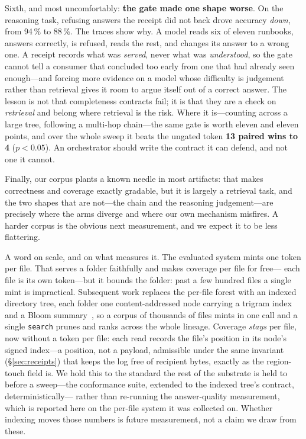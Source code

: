 \documentclass[10pt,twocolumn]{article}
\newcommand{\tok}[1]{\texttt{#1}}
\begin{document}
Sixth, and most uncomfortably: \textbf{the gate made one shape worse}. On the
reasoning task, refusing answers the receipt did not back drove accuracy
\emph{down}, from 94\,\% to 88\,\%. The traces show why. A model reads six of
eleven runbooks, answers correctly, is refused, reads the rest, and changes its
answer to a wrong one. A receipt records what was \emph{served}, never what was
\emph{understood}, so the gate cannot tell a consumer that concluded too early
from one that had already seen enough---and forcing more evidence on a model
whose difficulty is judgement rather than retrieval gives it room to argue
itself out of a correct answer. The lesson is not that completeness contracts
fail; it is that they are a check on \emph{retrieval} and belong where retrieval
is the risk. Where it is---counting across a large tree, following a multi-hop
chain---the same gate is worth eleven and eleven points, and over the whole sweep
it beats the ungated token \textbf{13 paired wins to 4} ($p<0.05$). An
orchestrator should write the contract it can defend, and not one it cannot.

Finally, our corpus plants a known needle in most artifacts: that makes
correctness and coverage exactly gradable, but it is largely a retrieval task,
and the two shapes that are not---the chain and the reasoning judgement---are
precisely where the arms diverge and where our own mechanism misfires. A harder
corpus is the obvious next measurement, and we expect it to be less flattering.

A word on scale, and on what measures it. The evaluated system mints one token
per file. That serves a folder faithfully and makes coverage per file for free---
each file is its own token---but it bounds the folder: past a few hundred files a
single mint is impractical. Subsequent work replaces the per-file forest with an
indexed directory tree, each folder one content-addressed node carrying a trigram
index and a Bloom summary~\citep{bloom1970}, so a corpus of thousands of files
mints in one call and a single \tok{search} prunes and ranks across the whole
lineage. Coverage \emph{stays} per file, now without a token per file: each read
records the file's position in its node's signed index---a position, not a
payload, admissible under the same invariant (\S\ref{sec:receipts}) that keeps
the log free of recipient bytes, exactly as the region-touch field is. We hold
this to the standard the rest of the substrate is held to before a sweep---the
conformance suite, extended to the indexed tree's contract, deterministically---
rather than re-running the answer-quality measurement, which is reported here on
the per-file system it was collected on. Whether indexing moves those numbers is
future measurement, not a claim we draw from these.
\end{document}
